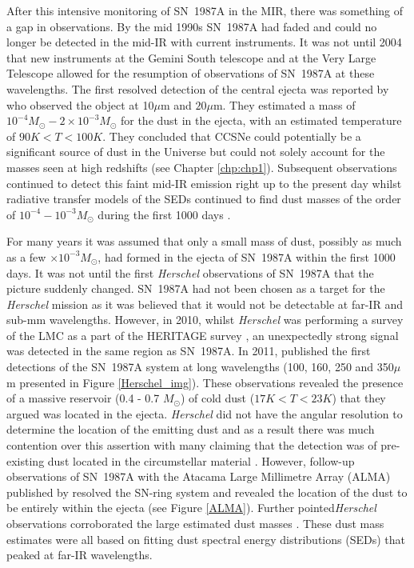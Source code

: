 After this intensive monitoring of SN~1987A in the MIR, there was something of a gap in observations.  By the mid 1990s SN~1987A had faded and could no longer be detected in the mid-IR with current instruments.  It was not until 2004 that new instruments at the Gemini South telescope and at the Very Large Telescope allowed for the resumption of observations of SN~1987A at these wavelengths.  The first resolved detection of the central ejecta was reported by \citet{Bouchet2004} who observed the object at 10$\mu$m and  $20\mu$m. They estimated a  mass  of $10^{-4}M_{\odot}-2 \times 10^{-3}M_{\odot}$ for the dust in the ejecta, with an estimated temperature of $90K<T<100K$.  They concluded that CCSNe could potentially be a significant source of dust in the Universe but could not solely account for the masses seen at high redshifts (see Chapter \ref{chp:chp1}).  Subsequent observations continued to detect this faint mid-IR emission right up to the present day \citep{Dwek2010,Bouchet2014} whilst radiative transfer models of the SEDs continued to find dust masses of the order of $10^{-4}-10^{-3}M_{\odot}$ during the first 1000 days \citep{Ercolano2007}.

For many years it was assumed that only a small mass of dust, possibly as much as a few $\times 10^{-3}M_{\odot}$, had formed in the ejecta of SN~1987A within the first 1000 days.  It was not until the first \textit{Herschel} observations of SN~1987A that the picture suddenly changed.  SN~1987A had not been chosen as a target for the \textit{Herschel} mission as it was believed that it would not be detectable at far-IR and sub-mm wavelengths.  However, in 2010, whilst \textit{Herschel} was performing a survey of the LMC as a part of the HERITAGE survey \citep{Meixner2013}, an unexpectedly strong signal was detected in the same region as SN~1987A.  In 2011, \citet{Matsuura2011} published the first detections of the SN~1987A system at long wavelengths (100, 160, 250 and 350$\mu$m presented in Figure \ref{Herschel_img}).  These observations revealed the presence of a massive reservoir (0.4 - 0.7 $M_{\odot}$) of cold dust ($17K<T<23K$) that they argued was located in the ejecta.  \textit{Herschel} did not have the angular resolution to determine the location of the emitting dust and as a result there was much contention over this assertion with many claiming that the detection was of pre-existing dust located in the circumstellar material \citep{Bouchet2014}.  However, follow-up observations of SN~1987A with the Atacama Large Millimetre Array (ALMA) published by \citet{Indebetouw2014} resolved the SN-ring system and revealed the location of the dust to be entirely within the ejecta (see Figure \ref{ALMA}).  Further pointed\textit{Herschel} observations corroborated the large estimated dust masses \citep{Matsuura2015}.  These dust mass estimates were all based on fitting dust spectral energy distributions (SEDs) that peaked at far-IR wavelengths.

